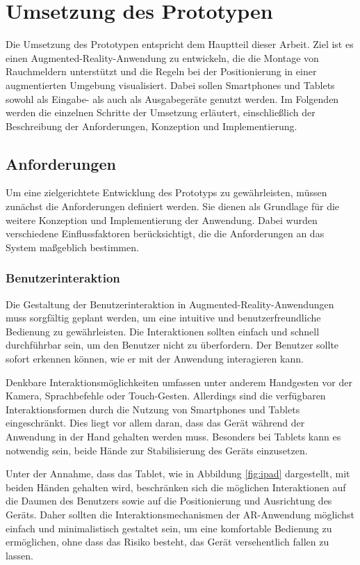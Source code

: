 \chapter{Umsetzung des Prototypen}

Die Umsetzung des Prototypen entspricht dem Hauptteil dieser Arbeit. Ziel ist es einen Augmented-Reality-Anwendung zu entwickeln, die die Montage von Rauchmeldern unterstützt und die Regeln bei der Positionierung in einer augmentierten Umgebung visualisiert. Dabei sollen Smartphones und Tablets sowohl als Eingabe- als auch als Ausgabegeräte genutzt werden. Im Folgenden werden die einzelnen Schritte der Umsetzung erläutert, einschließlich der Beschreibung der Anforderungen, Konzeption und Implementierung.

\section{Anforderungen}\label{sec:requirements}

Um eine zielgerichtete Entwicklung des Prototyps zu gewährleisten, müssen zunächst die Anforderungen definiert werden. Sie dienen als Grundlage für die weitere Konzeption und Implementierung der Anwendung. Dabei wurden verschiedene Einflussfaktoren berücksichtigt, die die Anforderungen an das System maßgeblich bestimmen.

\subsection{Benutzerinteraktion}

Die Gestaltung der Benutzerinteraktion in Augmented-Reality-Anwendungen muss sorgfältig geplant werden, um eine intuitive und benutzerfreundliche Bedienung zu gewährleisten. Die Interaktionen sollten einfach und schnell durchführbar sein, um den Benutzer nicht zu überfordern. Der Benutzer sollte sofort erkennen können, wie er mit der Anwendung interagieren kann. 

Denkbare Interaktionsmöglichkeiten umfassen unter anderem Handgesten vor der Kamera, Sprachbefehle oder Touch-Gesten. Allerdings sind die verfügbaren Interaktionsformen durch die Nutzung von Smartphones und Tablets eingeschränkt. Dies liegt vor allem daran, dass das Gerät während der Anwendung in der Hand gehalten werden muss. Besonders bei Tablets kann es notwendig sein, beide Hände zur Stabilisierung des Geräts einzusetzen.

Unter der Annahme, dass das Tablet, wie in Abbildung \ref{fig:ipad} dargestellt, mit beiden Händen gehalten wird, beschränken sich die möglichen Interaktionen auf die Daumen des Benutzers sowie auf die Positionierung und Ausrichtung des Geräts. Daher sollten die Interaktionsmechanismen der AR-Anwendung möglichst einfach und minimalistisch gestaltet sein, um eine komfortable Bedienung zu ermöglichen, ohne dass das Risiko besteht, das Gerät versehentlich fallen zu lassen.

